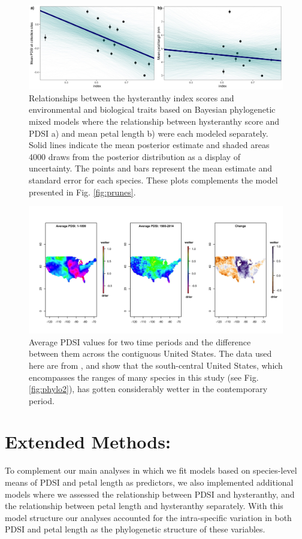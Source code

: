 \documentclass{article}[11pt]
\begin{document}
\begin{figure}[h!]
    \centering
 \includegraphics[width=.95\textwidth]{..//..//Plots/dataplots_SUPP.jpeg}
    \caption{Relationships between the hysteranthy index scores and environmental and biological traits based on Bayesian phylogenetic mixed models where the relationship between hysteranthy score and PDSI a)  and mean petal length b)  were each modeled separately. Solid lines indicate the mean posterior estimate and shaded areas 4000 draws from the posterior distribution as a display of uncertainty. The points and bars represent the mean estimate and standard error for each species. These plots complements the model presented in Fig. \ref{fig:prunes}.}
    \label{fig:seps}
\end{figure}

\begin{figure}[h!]
    \centering
 \includegraphics[width=\textwidth]{..//..//Plots/PDSIovertimemaps.jpeg}
    \caption{Average PDSI values for two time periods and the difference between them across the contiguous United States. The data used here are from \citet{Gile_2017}, and show that the south-central United States, which encompasses the ranges of many species in this study (see Fig. \ref{fig:phylo2}), has gotten considerably wetter in the contemporary period.}
    \label{fig:timeschange}
\end{figure}

\pagebreak

\section*{Extended Methods:}
To complement our main analyses in which we fit models based on species-level means of PDSI and petal length as predictors, we also implemented additional models where we assessed the relationship between PDSI and hysteranthy, and the relationship between petal length and hysteranthy separately. With this model structure our analyses accounted for the intra-specific variation in both PDSI and petal length as the phylogenetic structure of these variables.
\end{document}
